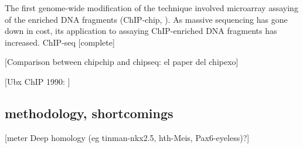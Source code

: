 The first genome-wide modification of the technique involved microarray assaying of the enriched DNA fragments (ChIP-chip, \cite{Ren2000}). As massive sequencing has gone down in cost, its application to assaying ChIP-enriched DNA fragments has increased. ChIP-seq \cite{Robertson2007} [complete]

[Comparison between chipchip and chipseq: el paper del chipexo]

[Ubx ChIP 1990: \cite{Gould1990}]

\subsection{methodology, shortcomings}




[meter Deep homology (eg tinman-nkx2.5, hth-Meis, Pax6-eyeless)?]
